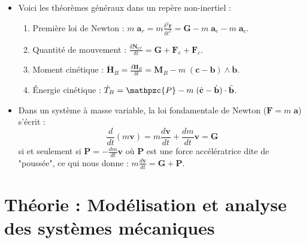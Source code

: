\documentclass[a4paper]{article}
\begin{document}
\begin{itemize}
\item Voici les théorèmes généraux dans un repère non-inertiel : 
\begin{enumerate}
\item Première loi de Newton : $\displaystyle m \; \textbf{a}_r = m \frac{\delta^2 \textbf{r}}{\delta t^2} = \textbf{G} - m \; \textbf{a}_e - m \; \textbf{a}_c $.
\item Quantité de mouvement : $\displaystyle \frac{\delta \textbf{N}_{O'}}{\delta t} = \textbf{G} + \textbf{F}_e + \textbf{F}_c $.
\item Moment cinétique : $\displaystyle \dot{\textbf{H}}_B = \frac{\delta \textbf{H}_B}{\delta t} = \textbf{M}_B - m \; (\textbf{c} - \textbf{b}) \wedge \ddot{\textbf{b}} $.
\item Énergie cinétique : $\displaystyle \dot{T}_B = \mathpzc{P} - m \; (\dot{\textbf{c}} - \dot{\textbf{b}}) \cdot \ddot{\textbf{b}} $.
\end{enumerate}





\item Dans un système à masse variable, la loi fondamentale de Newton ($\displaystyle \textbf{F} = m \; \textbf{a} $) s'écrit : 
\[ \frac{d}{d t} (m \textbf{v}) = m \frac{d \textbf{v}}{d t} + \frac{d m}{d t} \textbf{v} = \textbf{G} \]
si et seulement si $\displaystyle \textbf{P} = - \frac{d m}{d t} \textbf{v} $ où \textbf{P} est une force accélératrice dite de "poussée", ce qui nous donne : $\displaystyle m \frac{d \textbf{v}}{d t} = \textbf{G} + \textbf{P} $.







\end{itemize}





















\section{Théorie : Modélisation et analyse des systèmes mécaniques}
\end{document}
